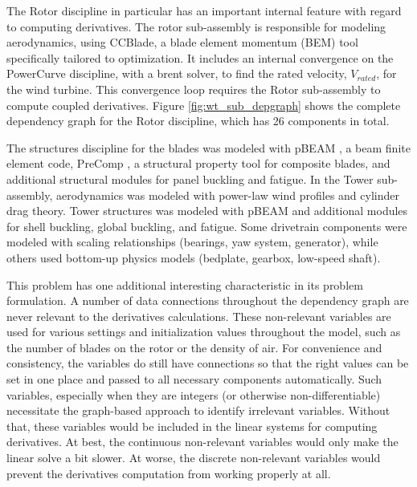 \documentclass[]{aiaa-tc} %
\begin{document}
    The Rotor discipline in particular has an important internal feature with regard to computing derivatives. 
    The rotor sub-assembly is responsible for modeling aerodynamics, using CCBlade\cite{NING:BEM}, 
    a blade element momentum (BEM) tool specifically tailored to optimization. It includes 
    an internal convergence on the PowerCurve discipline, with a brent solver, to find the 
    rated velocity, $V_{rated}$, for the wind turbine. This convergence loop requires the Rotor 
    sub-assembly to compute coupled derivatives. Figure \ref{fig:wt_sub_depgraph} shows the complete 
    dependency graph for the Rotor discipline, which has 26 components in total. 

    The structures discipline for the blades was modeled with pBEAM \cite{Ning2013b},
    a beam finite element code, PreComp \cite{Bir2005}, a structural property tool for
    composite blades, and additional structural modules for panel buckling and fatigue. In the Tower sub-assembly, 
    aerodynamics was modeled with power-law wind profiles and cylinder drag theory.
    Tower structures was modeled with pBEAM and additional modules for shell buckling,
    global buckling, and fatigue.  Some drivetrain components were modeled with scaling
    relationships (bearings, yaw system, generator), while others used bottom-up physics
    models (bedplate, gearbox, low-speed shaft). 



    \clearpage





    This problem has one additional interesting characteristic in its
    problem formulation. A number of data connections throughout the dependency
    graph are never relevant to the derivatives calculations. These non-relevant
    variables are used for various settings and initialization values throughout the
    model, such as the number of blades on the rotor or the density of air. For convenience 
    and consistency, the variables do still have connections so that the right values can 
    be set in one place and passed to all necessary components automatically. 
    Such variables, especially when they are integers (or otherwise non-differentiable)
    necessitate the graph-based approach to identify irrelevant variables. Without that, these
    variables would be included in the linear systems for computing derivatives. At best, 
    the continuous non-relevant variables would only make the linear solve a bit slower. 
    At worse, the discrete non-relevant variables would prevent the derivatives computation from working properly at all. 
\end{document}
